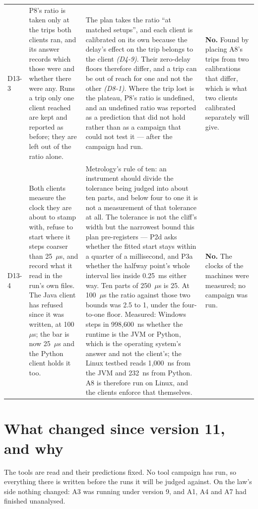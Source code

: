 \documentclass[11pt]{article}
\newcommand{\gl}[1]{{\color{soft}\itshape\small (#1)}}
\begin{document}
{\begin{longtable}{@{}p{1.1cm} >{\raggedright\arraybackslash}p{6.1cm} >{\raggedright\arraybackslash}p{6.0cm} >{\raggedright\arraybackslash}p{2.2cm}@{}}
D13-3 & P8's ratio is taken only at the trips both clients ran, and its answer records which those were and whether there were any. Runs a trip only one client reached are kept and reported as before; they are left out of the ratio alone. & The plan takes the ratio ``at matched setups'', and each client is calibrated on its own because the delay's effect on the trip belongs to the client \gl{D4-9}. Their zero-delay floors therefore differ, and a trip can be out of reach for one and not the other \gl{D8-1}. Where the trip lost is the plateau, P8's ratio is undefined, and an undefined ratio was reported as a prediction that did not hold rather than as a campaign that could not test it --- after the campaign had run. & \textbf{No.} Found by placing A8's trips from two calibrations that differ, which is what two clients calibrated separately will give. \\
D13-4 & Both clients measure the clock they are about to stamp with, refuse to start where it steps coarser than 25~$\mu$s, and record what it read in the run's own files. The Java client has refused since it was written, at 100~$\mu$s; the bar is now 25~$\mu$s and the Python client holds it too. & Metrology's rule of ten: an instrument should divide the tolerance being judged into about ten parts, and below four to one it is not a measurement of that tolerance at all. The tolerance is not the cliff's width but the narrowest bound this plan pre-registers --- P2d asks whether the fitted start stays within a quarter of a millisecond, and P3a whether the halfway point's whole interval lies inside 0.25~ms either way. Ten parts of 250~$\mu$s is 25. At 100~$\mu$s the ratio against those two bounds was 2.5 to 1, under the four-to-one floor. Measured: Windows steps in 998{,}600~ns whether the runtime is the JVM or Python, which is the operating system's answer and not the client's; the Linux testbed reads 1{,}000~ns from the JVM and 232~ns from Python. A8 is therefore run on Linux, and the clients enforce that themselves. & \textbf{No.} The clocks of the machines were measured; no campaign was run. \\
\bottomrule
\end{longtable}}

\section*{What changed since version 11, and why}
The tools are read and their predictions fixed. No tool campaign has run, so everything there is written before the runs it will be judged against. On the law's side nothing changed: A3 was running under version 9, and A1, A4 and A7 had finished unanalysed.
\end{document}

